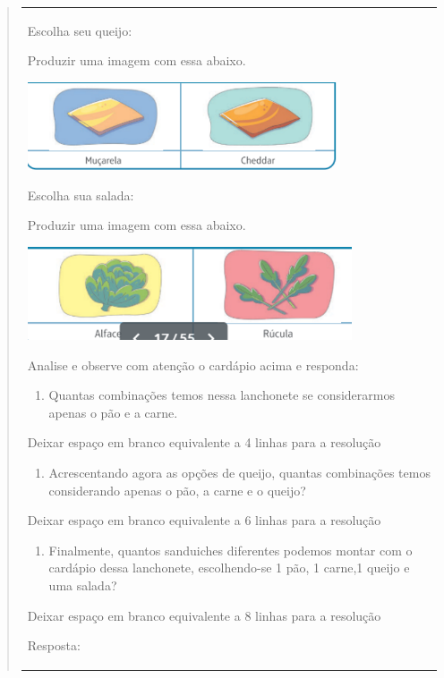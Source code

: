 \begin{enumerate}
\begin{escolha}
\begin{enumerate}
\begin{itemize}
\begin{itemize}
\begin{escolha}
\begin{quote}
\begin{escolha}
{\begin{longtable}[]{@{}l@{}}
\begin{itemize}
Escolha seu queijo:

Produzir uma imagem com essa abaixo.

\includegraphics[width=3.64103in,height=1.02299in]{media/image136.png}

Escolha sua salada:

Produzir uma imagem com essa abaixo.

\includegraphics[width=3.76923in,height=1.08430in]{media/image137.png}

Analise e observe com atenção o cardápio acima e responda:

\begin{enumerate}
\def\labelenumi{\alph{enumi})}
\item
  Quantas combinações temos nessa lanchonete se considerarmos apenas o
  pão e a carne.
\end{enumerate}

Deixar espaço em branco equivalente a 4 linhas para a resolução

\begin{enumerate}
\def\labelenumi{\alph{enumi})}
\item
  Acrescentando agora as opções de queijo, quantas combinações temos
  considerando apenas o pão, a carne e o queijo?
\end{enumerate}

Deixar espaço em branco equivalente a 6 linhas para a resolução

\begin{enumerate}
\def\labelenumi{\alph{enumi})}
\item
  Finalmente, quantos sanduiches diferentes podemos montar com o
  cardápio dessa lanchonete, escolhendo-se 1 pão, 1 carne,1 queijo e uma
  salada?
\end{enumerate}

Deixar espaço em branco equivalente a 8 linhas para a resolução

Resposta:


\end{itemize}
\end{longtable}}
\end{escolha}
\end{quote}
\end{escolha}
\end{itemize}
\end{itemize}
\end{enumerate}
\end{escolha}
\end{enumerate}
